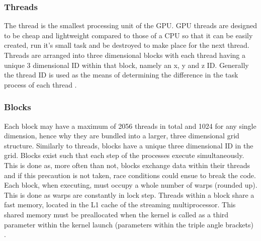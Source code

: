 \subsubsection{Threads}\label{gpu:ssec:thread}
The thread is the smallest processing unit of the GPU. GPU threads are designed to be cheap and lightweight compared to those of a CPU so that it can be easily created, run it's small task and be destroyed to make place for the next thread. Threads are arranged into three dimensional blocks with each thread having a unique 3 dimensional ID within that block, namely an x, y and z ID. Generally the thread ID is used as the means of determining the difference in the task process of each thread \citep{CUDA}.
%
\subsubsection{Blocks}\label{gpu:ssec:block}
Each block may have a maximum of 2056 threads in total and 1024 for any single dimension, hence why they are bundled into a larger, three dimensional grid structure. Similarly to threads, blocks have a unique three dimensional ID in the grid. Blocks exist such that each step of the processes execute simultaneously. This is done as, more often than not, blocks exchange data within their threads and if this precaution is not taken, race conditions could ensue to break the code. Each block, when executing, must occupy a whole number of warps (rounded up). This is done as warps are constantly in lock step. Threads within a block share a fast memory, located in the L1 cache of the streaming multiprocessor. This shared memory must be preallocated when the kernel is called as a third parameter within the kernel launch (parameters within the triple angle brackets) \citep{CUDA}.
%
